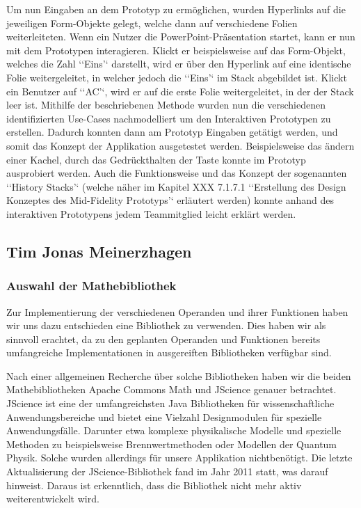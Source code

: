 Um nun Eingaben an dem Prototyp zu ermöglichen, wurden Hyperlinks auf die jeweiligen Form-Objekte gelegt, welche dann auf verschiedene Folien weiterleiteten. Wenn ein Nutzer die PowerPoint-Präsentation startet, kann er nun mit dem Prototypen interagieren. Klickt er beispielsweise auf das Form-Objekt, welches die Zahl ‘‘Eins’‘ darstellt, wird er über den Hyperlink auf eine identische Folie weitergeleitet, in welcher jedoch die ‘‘Eins’‘ im Stack abgebildet ist. Klickt ein Benutzer auf ‘‘AC’‘, wird er auf die erste Folie weitergeleitet, in der der Stack leer ist. Mithilfe der beschriebenen Methode wurden nun die verschiedenen identifizierten Use-Cases nachmodelliert um den Interaktiven Prototypen zu erstellen. Dadurch konnten dann am Prototyp Eingaben getätigt werden, und somit das Konzept der Applikation ausgetestet werden. Beispielsweise das ändern einer Kachel, durch das Gedrückthalten der Taste konnte im Prototyp ausprobiert werden. Auch die Funktionsweise und das Konzept der sogenannten ‘‘History Stacks’‘ (welche näher im Kapitel XXX 7.1.7.1 ‘‘Erstellung des Design Konzeptes des Mid-Fidelity Prototyps’‘ erläutert werden) konnte anhand des interaktiven Prototypens jedem Teammitglied leicht erklärt werden. 


\subsection{Tim Jonas Meinerzhagen}

\subsubsection{Auswahl der Mathebibliothek}

Zur Implementierung der verschiedenen Operanden und ihrer Funktionen haben wir uns dazu entschieden eine Bibliothek zu verwenden. Dies haben wir als sinnvoll erachtet, da zu den geplanten Operanden und Funktionen bereits umfangreiche Implementationen in ausgereiften Bibliotheken verfügbar sind.

Nach einer allgemeinen Recherche über solche Bibliotheken haben wir die beiden Mathebibliotheken Apache Commons Math und JScience genauer betrachtet. 
JScience ist eine der umfangreichsten Java Bibliotheken für wissenschaftliche Anwendungsbereiche und bietet eine Vielzahl Designmodulen für spezielle Anwendungsfälle. Darunter etwa komplexe physikalische Modelle und spezielle Methoden zu beispielsweise Brennwertmethoden oder Modellen der Quantum Physik. Solche wurden allerdings für unsere Applikation nichtbenötigt. Die letzte Aktualisierung der JScience-Bibliothek fand im Jahr 2011 statt, was darauf hinweist. Daraus ist erkenntlich, dass die Bibliothek nicht mehr aktiv weiterentwickelt wird. 

